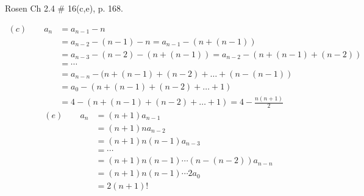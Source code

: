 \begin{questions}
 Rosen Ch 2.4 \# 16(c,e), p. 168.
    \ifprintanswers
        \vspace{-10pt}
   \fi
\begin{solution}
        \vspace{-0.1in} 
        \begin{align*}
            (c) \quad \quad a_n &= a_{n-1} - n \\
            &= a_{n-2} -(n-1) - n = a_{n-1} - (n + (n-1)) \\
            &= a_{n-3} -(n-2) - (n + (n-1)) = a_{n-2} - (n + (n-1) + (n-2)) \\
            &= \cdots \\
            &= a_{n-n} -(n + (n-1) + (n-2) + \ldots + (n- (n-1)) \\
            &= a_0 - (n + (n-1) + (n-2) + \ldots + 1) \\
            &= 4 - (n + (n-1) + (n-2) + \ldots + 1) = 4 -\frac{n(n+1)}{2}
        \end{align*}
        \vspace{-0.1in}
        \begin{align*}
            (e) \quad \quad a_n &= (n+1)a_{n-1} \\
              &= (n+1)na_{n-2} \\
              &= (n+1)n(n-1)a_{n-3} \\
              &= \cdots \\
              &= (n+1)n(n-1)\cdots(n-(n-2))a_{n-n} \\
              &= (n+1)n(n-1)\cdots2a_{0} \\
              &= 2(n+1)!
        \end{align*}
\end{solution}



\end{questions}
